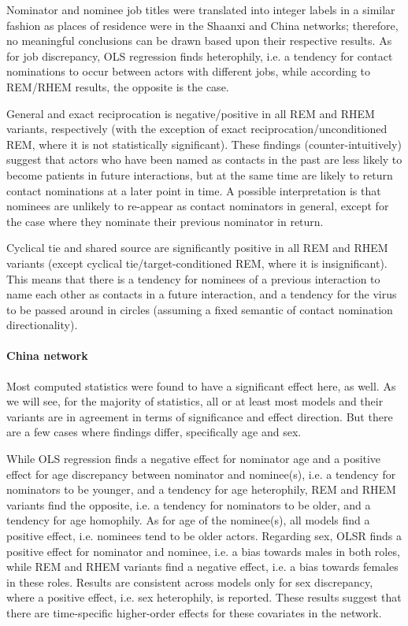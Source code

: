 Nominator and nominee job titles were translated into integer labels in a similar fashion as places of residence were in the Shaanxi and China networks; therefore, no meaningful conclusions can be drawn based upon their respective results. As for job discrepancy, OLS regression finds heterophily, i.e. a tendency for contact nominations to occur between actors with different jobs, while according to REM/RHEM results, the opposite is the case.

General and exact reciprocation is negative/positive in all REM and RHEM variants, respectively (with the exception of exact reciprocation/unconditioned REM, where it is not statistically significant). These findings (counter-intuitively) suggest that actors who have been named as contacts in the past are less likely to become patients in future interactions, but at the same time are likely to return contact nominations at a later point in time. A possible interpretation is that nominees are unlikely to re-appear as contact nominators in general, except for the case where they nominate their previous nominator in return.

Cyclical tie and shared source are significantly positive in all REM and RHEM variants (except cyclical tie/target-conditioned REM, where it is insignificant). This means that there is a tendency for nominees of a previous interaction to name each other as contacts in a future interaction, and a tendency for the virus to be passed around in circles (assuming a fixed semantic of contact nomination directionality).

\paragraph{China network} Most computed statistics were found to have a significant effect here, as well. As we will see, for the majority of statistics, all or at least most models and their variants are in agreement in terms of significance and effect direction. But there are a few cases where findings differ, specifically age and sex. 

While OLS regression finds a negative effect for nominator age and a positive effect for age discrepancy between nominator and nominee(s), i.e. a tendency for nominators to be younger, and a tendency for age heterophily, REM and RHEM variants find the opposite, i.e. a tendency for nominators to be older, and a tendency for age homophily. As for age of the nominee(s), all models find a positive effect, i.e. nominees tend to be older actors. Regarding sex, OLSR finds a positive effect for nominator and nominee, i.e. a bias towards males in both roles, while REM and RHEM variants find a negative effect, i.e. a bias towards females in these roles. Results are consistent across models only for sex discrepancy, where a positive effect, i.e. sex heterophily, is reported. These results suggest that there are time-specific higher-order effects for these covariates in the network.

